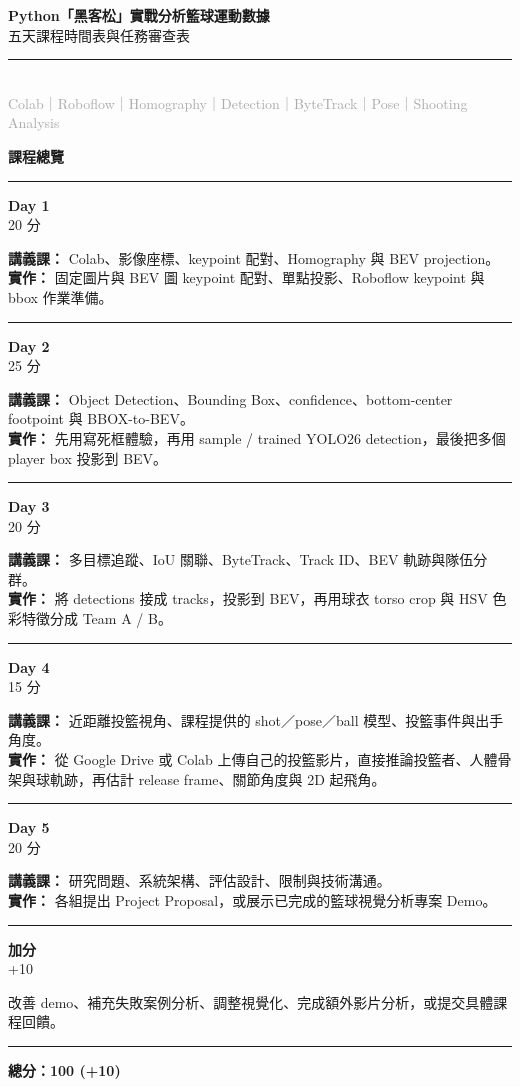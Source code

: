 \documentclass[11pt]{article}
\newcommand{\overviewitem}[4]{%
  \noindent
  \begin{minipage}[t]{0.12\textwidth}
    \textbf{#1}\\[-0.5mm]
    {\scriptsize #4}
  \end{minipage}
  \hfill
  \begin{minipage}[t]{0.84\textwidth}
    {\scriptsize\textbf{講義課：} #2}\\[-0.2mm]
    {\scriptsize\textbf{實作：} #3}
  \end{minipage}
  \par\vspace{1.2mm}
  \hrule
  \vspace{1.2mm}
}
\begin{document}
\newcommand{\tasktableheader}{%
  \rowcolor{MainBlue}
  \textcolor{white}{\textbf{完成}} &
  \textcolor{white}{\textbf{編號}} &
  \textcolor{white}{\textbf{類型}} &
  \textcolor{white}{\textbf{任務內容}} &
  \textcolor{white}{\textbf{審查方式}} &
  \textcolor{white}{\textbf{分數}} \\ \hline
}

\begin{center}
  {\Huge \textbf{Python「黑客松」實戰分析籃球運動數據}}\\[4pt]
  {\Large 五天課程時間表與任務審查表}\\[10pt]
  \rule{0.9\textwidth}{0.6pt}\\[8pt]
  {\large \textcolor{DarkGray}{Colab｜Roboflow｜Homography｜Detection｜ByteTrack｜Pose｜Shooting Analysis}}
\end{center}
\vspace{2mm}

\begin{tcolorbox}[colback=SoftGray,colframe=DarkGray,arc=1mm,boxrule=0.45pt,left=3mm,right=3mm,top=2mm,bottom=2mm]
  {\large\bfseries 課程總覽}
  \vspace{2mm}\hrule\vspace{1.5mm}

\overviewitem{Day 1}{Colab、影像座標、keypoint 配對、Homography 與 BEV projection。}{固定圖片與 BEV 圖 keypoint 配對、單點投影、Roboflow keypoint 與 bbox 作業準備。}{20 分}
  \overviewitem{Day 2}{Object Detection、Bounding Box、confidence、bottom-center footpoint 與 BBOX-to-BEV。}{先用寫死框體驗，再用 sample / trained YOLO26 detection，最後把多個 player box 投影到 BEV。}{25 分}
  \overviewitem{Day 3}{多目標追蹤、IoU 關聯、ByteTrack、Track ID、BEV 軌跡與隊伍分群。}{將 detections 接成 tracks，投影到 BEV，再用球衣 torso crop 與 HSV 色彩特徵分成 Team A / B。}{20 分}
  \overviewitem{Day 4}{近距離投籃視角、課程提供的 shot／pose／ball 模型、投籃事件與出手角度。}{從 Google Drive 或 Colab 上傳自己的投籃影片，直接推論投籃者、人體骨架與球軌跡，再估計 release frame、關節角度與 2D 起飛角。}{15 分}
  \overviewitem{Day 5}{研究問題、系統架構、評估設計、限制與技術溝通。}{各組提出 Project Proposal，或展示已完成的籃球視覺分析專案 Demo。}{20 分}

  \noindent
  \begin{minipage}[t]{0.12\textwidth}\textbf{加分}\\[-0.5mm]{\scriptsize +10}\end{minipage}
  \hfill
  \begin{minipage}[t]{0.84\textwidth}{\scriptsize 改善 demo、補充失敗案例分析、調整視覺化、完成額外影片分析，或提交具體課程回饋。}\end{minipage}

  \vspace{2mm}\hrule\vspace{1.5mm}
  \hfill {\bfseries 總分：100 (+10)}
\end{tcolorbox}
\end{document}
